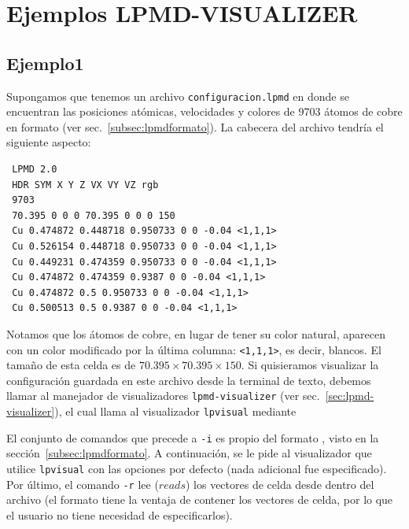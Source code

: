 \section{Ejemplos LPMD-VISUALIZER}

\subsection{Ejemplo1}

Supongamos que tenemos un archivo \verb+configuracion.lpmd+ en donde se encuentran las posiciones at\'omicas, velocidades y colores de 9703 \'atomos de cobre en formato {\lpmd} (ver sec.~\ref{subsec:lpmdformato}). La cabecera del archivo tendr\'ia el siguiente aspecto:\\

 \begin{verbatim}
 LPMD 2.0
 HDR SYM X Y Z VX VY VZ rgb 
 9703
 70.395 0 0 0 70.395 0 0 0 150
 Cu 0.474872 0.448718 0.950733 0 0 -0.04 <1,1,1>
 Cu 0.526154 0.448718 0.950733 0 0 -0.04 <1,1,1>
 Cu 0.449231 0.474359 0.950733 0 0 -0.04 <1,1,1>
 Cu 0.474872 0.474359 0.9387 0 0 -0.04 <1,1,1>
 Cu 0.474872 0.5 0.950733 0 0 -0.04 <1,1,1>
 Cu 0.500513 0.5 0.9387 0 0 -0.04 <1,1,1>
 \end{verbatim}

Notamos que los \'atomos de cobre, en lugar de tener su color natural, aparecen con un color modificado por la \'ultima columna: \verb+<1,1,1>+, es decir, blancos. El tama\~no de esta celda es de $70.395\times70.395\times150$. Si quisieramos visualizar la configuraci\'on guardada en este archivo desde la terminal de texto, debemos llamar al manejador de visualizadores \verb+lpmd-visualizer+ (ver sec.~\ref{sec:lpmd-visualizer}), el cual llama al visualizador \verb+lpvisual+ mediante


El conjunto de comandos que precede a \verb+-i+ es propio del formato {\lpmd}, visto en la secci\'on~\ref{subsec:lpmdformato}. A continuaci\'on, se le pide al visualizador que utilice \verb+lpvisual+ con las opciones por defecto (nada adicional fue especificado). Por \'ultimo, el comando \verb+-r+ lee ($reads$) los vectores de celda desde dentro del archivo (el formato {\lpmd} tiene la ventaja de contener los vectores de celda, por lo que el usuario no tiene necesidad de especificarlos).


